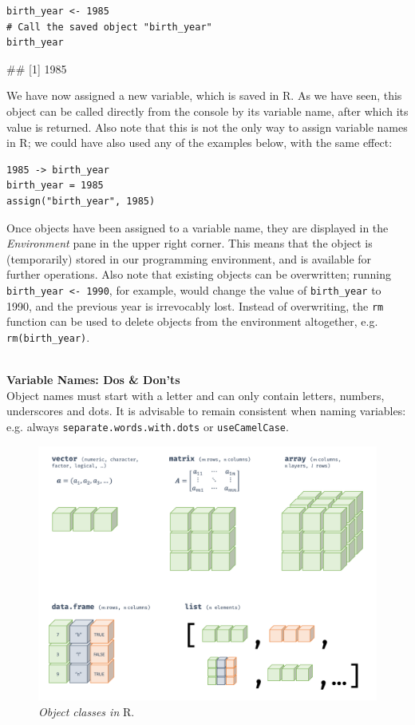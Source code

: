 \begin{lstlisting}
birth_year <- 1985
# Call the saved object "birth_year"
birth_year
\end{lstlisting}
\begin{example}
## [1] 1985
\end{example}

We have now assigned a new variable, which is saved in \textsf{R}. As we have seen, this object can be called directly from the console by its variable name, after which its value is returned. Also note that this is not the only way to assign variable names in \textsf{R}; we could have also used any of the examples below, with the same effect:

\begin{lstlisting}
1985 -> birth_year
birth_year = 1985
assign("birth_year", 1985)
\end{lstlisting}

Once objects have been assigned to a variable name, they are displayed in the \emph{Environment} pane in the upper right corner. This means that the object is (temporarily) stored in our programming environment, and is available for further operations. Also note that existing objects can be overwritten; running \texttt{birth\_year <- 1990}, for example, would change the value of \texttt{birth\_year} to 1990, and the previous year is irrevocably lost. Instead of overwriting, the \texttt{rm} function can be used to delete objects from the environment altogether, e.g. \texttt{rm(birth\_year)}.

\begin{box-important} \\
\textcolor{burgundyred}{\textbf{Variable Names: Dos \& Don'ts}} \\
Object names must start with a letter and can only contain letters, numbers, underscores and dots. It is advisable to remain consistent when naming variables: e.g. always \texttt{separate.words.with.dots} or \texttt{useCamelCase}.
\end{box-important}

\begin{figure}[t]
\includegraphics[width=12cm]{images/objektklassen.png}
\captionsetup{labelformat=empty} 
\centering
\caption{\emph{Object classes in} \textsf{R}.}
\end{figure}

